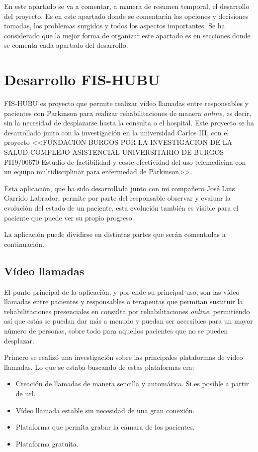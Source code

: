 
En este apartado se va a comentar, a manera de resumen temporal, el desarrollo del proyecto. Es en este apartado donde se comentarán las opciones y decisiones tomadas, los problemas surgidos y todos los aspectos importantes. Se ha considerado que la mejor forma de organizar este apartado es en secciones donde se comenta cada apartado del desarrollo.

\section{Desarrollo FIS-HUBU}\label{desarrolloFH}
FIS-HUBU es proyecto que permite realizar vídeo llamadas entre responsables y pacientes con Parkinson para realizar rehabilitaciones de manera \textit{online}, es decir, sin la necesidad de desplazarse hasta la consulta o el hospital. Este proyecto se ha desarrollado junto con la investigación en la universidad Carlos III, con el proyecto  <<FUNDACION
BURGOS POR LA
INVESTIGACION
DE LA SALUD COMPLEJO
ASISTENCIAL
UNIVERSITARIO
DE BURGOS 
PI19/00670 
Estudio de factibilidad y
coste-efectividad del uso
telemedicina con un equipo
multidisciplinar para
enfermedad de Parkinson>>.

Esta aplicación, que ha sido desarrollada junto con mi compañero José Luis Garrido Labrador, permite por parte del responsable observar y evaluar la evolución del estado de un paciente, esta evolución también es visible para el paciente que puede ver su propio progreso.

La aplicación puede dividirse en distintas partes que serán comentadas a continuación.
\subsection{Vídeo llamadas}
El punto principal de la aplicación, y por ende su principal uso, son las vídeo llamadas entre pacientes y responsables o terapeutas que permitan sustituir la rehabilitaciones presenciales en consulta por rehabilitaciones \textit{online}, permitiendo así que estás se puedan dar más a menudo y puedan ser accesibles para un mayor número de personas, sobre todo para aquellos pacientes que no se pueden desplazar.

Primero se realizó una investigación sobre las principales plataformas de vídeo llamadas. Lo que se estaba buscando de estas plataformas era:
\begin{itemize}
	\item Creación de llamadas de manera sencilla y automática. Si es posible a partir de url.
	\item Vídeo llamada estable sin necesidad de una gran conexión.
	\item Plataforma que permita grabar la cámara de los pacientes.
	\item Plataforma gratuita.
\end{itemize}


